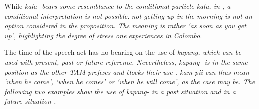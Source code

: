 While \em kala- \em bears some resemblance to the conditional particle \em kalu\em, in , a conditional interpretation is not possible: not getting up in the morning is not an option considered in the proposition. The meaning is rather `as soon as you get up', highlighting the degree of stress one experiences in Colombo.

% 
% 



 


The time of the speech act has no bearing on the use of \em kapang\em, which can be used with present, past or future reference. Nevertheless, \em kapang- \em is in the same position as the other TAM-prefixes and blocks their use \citep[cf.][]{Slomanson2008ismil}. \em kam-pii \em can thus mean `when he came', `when he comes' or `when he will come', as the case may be. The following two examples show the use of \em kapang- \em in a past situation  and in a future situation .


